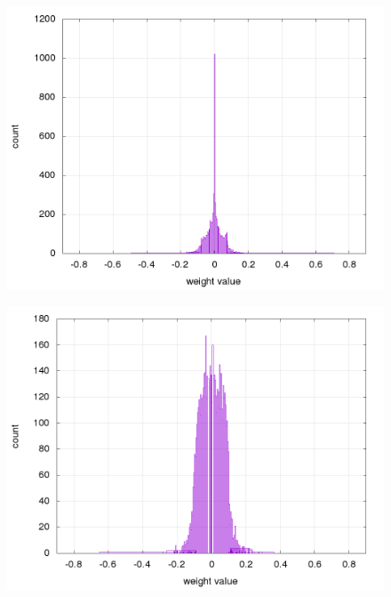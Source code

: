 \documentclass[10pt,a4paper]{article}
\begin{document}
\begin{figure}[!htb]
\centering
\begin{minipage}{.5\textwidth}
  \centering
  \includegraphics[scale=0.32]{../../results/rl_arcade/fnn_trained_0/supervised/layer_1_histogram.png}
  \label{img:FNN sparse weights histogram}
\end{minipage}%
\begin{minipage}{.5\textwidth}
  \centering
  \includegraphics[scale=0.32]{../../results/rl_arcade/fnn_trained_5/supervised/layer_1_histogram.png}
  \label{img:FNN no sparse weights histogram}
\end{minipage}
\end{figure}
\end{document}
